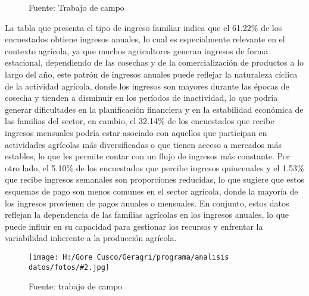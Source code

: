 \documentclass{article}\usepackage[]{graphicx}\usepackage[table]{xcolor}
\makeatletter
\newenvironment{kframe}{%
 \def\at@end@of@kframe{}%
 \ifinner\ifhmode%
  \def\at@end@of@kframe{\end{minipage}}%
  \begin{minipage}{\columnwidth}%
 \fi\fi%
 \def\FrameCommand##1{\hskip\@totalleftmargin \hskip-\fboxsep
 \colorbox{shadecolor}{##1}\hskip-\fboxsep
     \hskip-\linewidth \hskip-\@totalleftmargin \hskip\columnwidth}%
 \MakeFramed {\advance\hsize-\width
   \@totalleftmargin\z@ \linewidth\hsize
   \@setminipage}}%
 {\par\unskip\endMakeFramed%
 \at@end@of@kframe}
\newenvironment{knitrout}{}{} %
\newenvironment{fotos}[2]
{\begin{figure}[H]
	\centering
	\caption{#1}
	\texttt{[image: H:/Gore Cusco/Geragri/programa/analisis datos/fotos/\#2.jpg]}
	\caption*{Fuente: trabajo de campo}}
{\end{figure}}
\makeatother
\begin{document}
\begin{figure}[H]
  \centering
  \caption{Distribucion del tipo de ingreso familiar}
\begin{knitrout}
\color{fgcolor}\begin{kframe}


{\ttfamily\noindent\bfseries{}}

{\ttfamily\noindent{}}

{\ttfamily\noindent\bfseries{}}

{\ttfamily\noindent\bfseries\color{errorcolor}{\#\# Error: objeto 'datos' no encontrado}}

{\ttfamily\noindent\bfseries\color{errorcolor}{\#\# Error: objeto 'datos' no encontrado}}

{\ttfamily\noindent\bfseries\color{errorcolor}{\#\# Error: objeto 'datos' no encontrado}}

{\ttfamily\noindent\bfseries\color{errorcolor}{\#\# Error: objeto 'graph1' no encontrado}}\end{kframe}
\end{knitrout}
  \caption*{Fuente: Trabajo de campo}
\end{figure}
La tabla que presenta el tipo de ingreso familiar indica que el 61.22\% de los encuestados obtiene ingresos anuales, lo cual es especialmente relevante en el contexto agrícola, ya que muchos agricultores generan ingresos de forma estacional, dependiendo de las cosechas y de la comercialización de productos a lo largo del año, este patrón de ingresos anuales puede reflejar la naturaleza cíclica de la actividad agrícola, donde los ingresos son mayores durante las épocas de cosecha y tienden a disminuir en los períodos de inactividad, lo que podría generar dificultades en la planificación financiera y en la estabilidad económica de las familias del sector, en cambio, el 32.14\% de los encuestados que recibe ingresos mensuales podría estar asociado con aquellos que participan en actividades agrícolas más diversificadas o que tienen acceso a mercados más estables, lo que les permite contar con un flujo de ingresos más constante. Por otro lado, el 5.10\% de los encuestados que percibe ingresos quincenales y el 1.53\% que recibe ingresos semanales son proporciones reducidas, lo que sugiere que estos esquemas de pago son menos comunes en el sector agrícola, donde la mayoría de los ingresos provienen de pagos anuales o mensuales. En conjunto, estos datos reflejan la dependencia de las familias agrícolas en los ingresos anuales, lo que puede influir en su capacidad para gestionar los recursos y enfrentar la variabilidad inherente a la producción agrícola.
\begin{fotos}
{Aplicacion de encuestas}{3}
\end{fotos}
\end{document}
